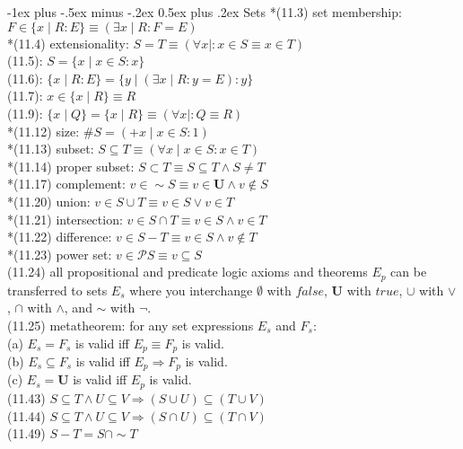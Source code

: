 \documentclass[10pt,landscape]{article}
\makeatletter
\renewcommand{\section}{\@startsection{section}{1}{0mm}%
                                {-1ex plus -.5ex minus -.2ex}%
                                {0.5ex plus .2ex}%
                                {\normalfont\small\bfseries}}
\makeatother
\begin{document}
\begin{multicols}{3}
{\section{Sets}
*(11.3) set membership: $F\in \{x\mid R:E\}\equiv (\exists x\mid R:F=E)$\\
*(11.4) extensionality: $S=T\equiv (\forall x\mid: x\in S\equiv x\in T)$\\
(11.5): $S=\{x\mid x\in S:x\}$\\
(11.6): $\{x\mid R:E\}=\{y\mid (\exists x\mid R:y=E):y\}$\\
(11.7): $x\in \{x\mid R\}\equiv R$\\
(11.9): $\{x\mid Q\}=\{x\mid R\}\equiv (\forall x\mid: Q\equiv R)$\\
*(11.12) size: $\#S=(+x\mid x\in S: 1)$\\
*(11.13) subset: $S\subseteq T\equiv (\forall x\mid x\in S:x\in T)$\\
*(11.14) proper subset: $S\subset T\equiv S\subseteq T\land S\neq T$\\
*(11.17) complement: $v\in \sim S\equiv v\in \textbf{U}\land v\not\in S$\\
*(11.20) union: $v\in S\cup T\equiv v\in S\lor v\in T$\\
*(11.21) intersection: $v\in S\cap T\equiv v\in S\land v\in T$\\
*(11.22) difference: $v\in S-T\equiv v\in S\land v\not\in T$\\
*(11.23) power set: $v\in\mathcal{P}S\equiv v\subseteq S$\\
(11.24) all propositional and predicate logic axioms and theorems $E_p$ can be transferred to sets $E_s$ where you interchange $\emptyset$ with $false$, \textbf{U} with $true$, $\cup$ with $\lor$, $\cap$ with $\land$, and $\sim$ with $\neg$.\\
(11.25) metatheorem: for any set expressions $E_s$ and $F_s$:\\
\qquad (a) $E_s=F_s$ is valid iff $E_p\equiv F_p$ is valid.\\
\qquad (b) $E_s\subseteq F_s$ is valid iff $E_p\Rightarrow F_p$ is valid.\\
\qquad (c) $E_s=\textbf{U}$ is valid iff $E_p$ is valid.\\
(11.43) $S\subseteq T\land U\subseteq V\Rightarrow (S\cup U)\subseteq(T\cup V)$\\
(11.44) $S\subseteq T\land U\subseteq V\Rightarrow (S\cap U)\subseteq(T\cap V)$\\
(11.49) $S-T=S\cap\sim T$\\
}
\end{multicols}
\end{document}
